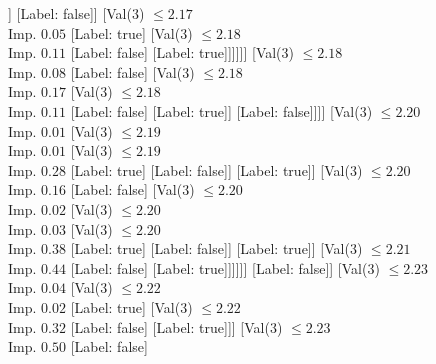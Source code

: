 \documentclass[margin=10pt]{standalone}
\begin{document}
\begin{forest}
																										]
																									[Label: false]]
																								[Val($3$) $ \leq 2.17$ \\ Imp. $0.05$
																									[Label: true]
																									[Val($3$) $ \leq 2.18$ \\ Imp. $0.11$
																										[Label: false]
																										[Label: true]]]]]]
																					[Val($3$) $ \leq 2.18$ \\ Imp. $0.08$
																						[Label: false]
																						[Val($3$) $ \leq 2.18$ \\ Imp. $0.17$
																							[Val($3$) $ \leq 2.18$ \\ Imp. $0.11$
																								[Label: false]
																								[Label: true]]
																							[Label: false]]]]
																				[Val($3$) $ \leq 2.20$ \\ Imp. $0.01$
																					[Val($3$) $ \leq 2.19$ \\ Imp. $0.01$
																						[Val($3$) $ \leq 2.19$ \\ Imp. $0.28$
																							[Label: true]
																							[Label: false]]
																						[Label: true]]
																					[Val($3$) $ \leq 2.20$ \\ Imp. $0.16$
																						[Label: false]
																						[Val($3$) $ \leq 2.20$ \\ Imp. $0.02$
																							[Val($3$) $ \leq 2.20$ \\ Imp. $0.03$
																								[Val($3$) $ \leq 2.20$ \\ Imp. $0.38$
																									[Label: true]
																									[Label: false]]
																								[Label: true]]
																							[Val($3$) $ \leq 2.21$ \\ Imp. $0.44$
																								[Label: false]
																								[Label: true]]]]]]
																			[Label: false]]
																		[Val($3$) $ \leq 2.23$ \\ Imp. $0.04$
																			[Val($3$) $ \leq 2.22$ \\ Imp. $0.02$
																				[Label: true]
																				[Val($3$) $ \leq 2.22$ \\ Imp. $0.32$
																					[Label: false]
																					[Label: true]]]
																			[Val($3$) $ \leq 2.23$ \\ Imp. $0.50$
																				[Label: false]

\end{forest}
\end{document}

